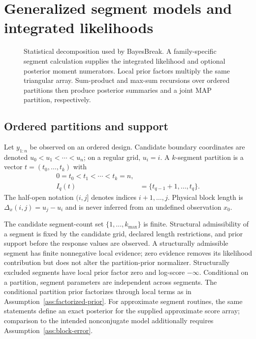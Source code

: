 \section{Generalized segment models and integrated likelihoods}
\label{sec:model}

\begin{figure}[t]
  \centering
  \resizebox{0.94\textwidth}{!}{}
  \caption{Statistical decomposition used by BayesBreak. A family-specific segment calculation supplies the integrated likelihood and optional posterior moment numerators. Local prior factors multiply the same triangular array. Sum-product and max-sum recursions over ordered partitions then produce posterior summaries and a joint MAP partition, respectively.}
  \label{fig:block-to-global}
\end{figure}

\subsection{Ordered partitions and support}
Let $y_{1:n}$ be observed on an ordered design. Candidate boundary coordinates are denoted
$u_0<u_1<\cdots<u_n$; on a regular grid, $u_i=i$. A $k$-segment partition is a vector
$t=(t_0,\ldots,t_k)$ with
\[
\begin{aligned}
0=t_0<t_1<\cdots<t_k=n,\\
I_q(t)&=\{t_{q-1}+1,\ldots,t_q\}.
\end{aligned}
\]
The half-open notation $(i,j]$ denotes indices $i+1,\ldots,j$. Physical block length is
$\Delta_x(i,j)=u_j-u_i$ and is never inferred from an undefined observation $x_0$.

\begin{assumption}
\label{ass:offline}
The candidate segment-count set $\{1,\ldots,k_{\max}\}$ is finite. Structural admissibility of a segment is fixed by the candidate grid, declared length restrictions, and prior support before the response values are observed. A structurally admissible segment has finite nonnegative local evidence; zero evidence removes its likelihood contribution but does not alter the partition-prior normalizer. Structurally excluded segments have local prior factor zero and log-score $-\infty$. Conditional on a partition, segment parameters are independent across segments. The conditional partition prior factorizes through local terms as in Assumption~\ref{ass:factorized-prior}. For approximate segment routines, the same statements define an exact posterior for the supplied approximate score array; comparison to the intended nonconjugate model additionally requires Assumption~\ref{ass:block-error}.
\end{assumption}

